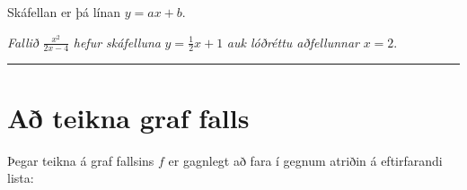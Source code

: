 \documentclass[b5paper,11pt,icelandic]{sphinxmanual}
\begin{document}
Skáfellan er þá línan \(y=ax+b\).


\emph{Fallið} \(\frac{x^2}{2x-4}\) \emph{hefur skáfelluna} \(y=\frac{1}{2}x+1\) \emph{auk lóðréttu aðfellunnar} \(x=2\).


\bigskip\hrule{}\bigskip

\newpage

\section{Að teikna graf falls}
\label{kafli05:a-teikna-graf-falls}
Þegar teikna á graf fallsins \(f\) er gagnlegt að fara í gegnum atriðin á eftirfarandi lista:
\end{document}
